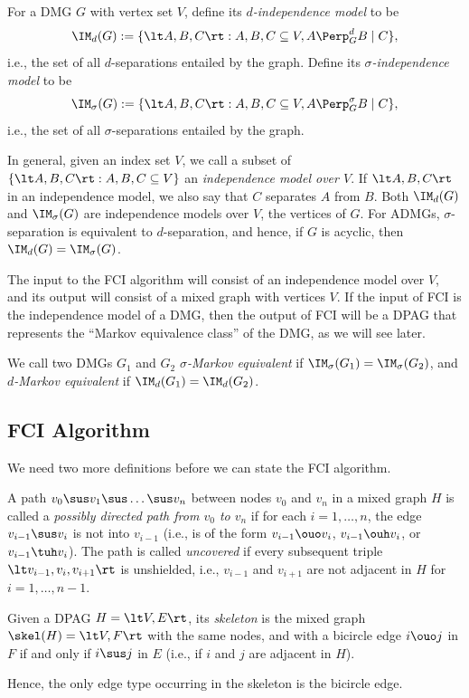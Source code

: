 \begin{Def}\label{def:independence_model}
  For a DMG $G$ with vertex set $V$, define its \emph{$d$-independence model} to be
  $$\IM_d(G) := \{ \lt A, B, C \rt : A, B, C \subseteq V, A \Perp_G^d B \mid C \},$$
  i.e., the set of all $d$-separations entailed by the graph. Define its
  \emph{$\sigma$-independence model} to be
  $$\IM_\sigma(G) := \{ \lt A, B, C \rt : A, B, C \subseteq V, A \Perp_G^\sigma B \mid C \},$$
  i.e., the set of all $\sigma$-separations entailed by the graph. 
\end{Def}
In general, given an index set $V$, we call a subset of 
$\{ \lt A, B, C \rt : A, B, C \subseteq V \}$
an \emph{independence model over $V$}.
If $\lt A, B, C \rt$ in an independence model, we also say that $C$ separates $A$ from $B$.
Both $\IM_d(G)$ and $\IM_\sigma(G)$ are independence models over $V$, the vertices of $G$.
For ADMGs, $\sigma$-separation is equivalent to $d$-separation, and hence, if $G$ is acyclic, then
$\IM_d(G) = \IM_\sigma(G)$.

The input to the FCI algorithm will consist of an independence model over $V$,
and its output will consist of a mixed graph with vertices $V$.
If the input of FCI is the independence model of a DMG, then the output of FCI
will be a DPAG that represents the ``Markov equivalence class'' of the DMG, as
we will see later.
\begin{Def}\label{def:Markov_equivalent}
  We call two DMGs $G_1$ and $G_2$ \emph{$\sigma$-Markov equivalent} if $\IM_\sigma(G_1) = \IM_\sigma(G_2)$,
  and \emph{$d$-Markov equivalent} if $\IM_d(G_1) = \IM_d(G_2)$.
\end{Def}

\subsection{FCI Algorithm}

We need two more definitions before we can state the FCI algorithm.
\begin{Def}\label{def:pdpath}
  A path $v_0 \sus v_1 \sus \dots \sus v_n$ between nodes $v_0$ and $v_n$ in a mixed graph $H$ is called a \emph{possibly directed path from $v_0$ to $v_n$} if for each $i=1,\dots,n$, the edge $v_{i-1} \sus v_i$ is not into $v_{i-1}$ (i.e., is of the form $v_{i-1} \ouo v_i$, $v_{i-1} \ouh v_i$, or $v_{i-1} \tuh v_i$). 
  The path is called \emph{uncovered} if every subsequent triple $\lt v_{i-1}, v_i, v_{i+1} \rt$ is unshielded, i.e., $v_{i-1}$ and $v_{i+1}$ are not adjacent in $H$ for $i=1,\dots,n-1$.
\end{Def}
\begin{Def}\label{def:skeleton}
Given a DPAG $H = \lt V, E \rt$, its \emph{skeleton} is the mixed graph 
$\skel(H) = \lt V, F \rt$ with the same nodes, and with a bicircle edge $i \ouo j$ in $F$
  if and only if $i \sus j$ in $E$ (i.e., if $i$ and $j$ are adjacent in $H$).
\end{Def}
Hence, the only edge type occurring in the skeleton is the bicircle edge.

